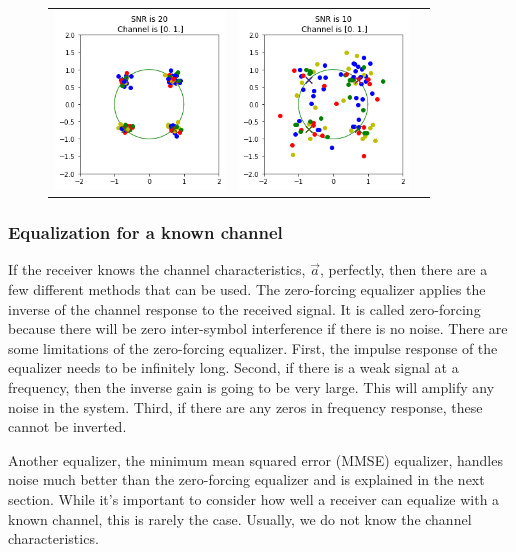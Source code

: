\begin{figure}
\begin{tabular}{ccc}
    \includegraphics[width=45mm]{figures/equal_intro/snr_20_c5/cfo_0.png}&
    \includegraphics[width=45mm]{figures/equal_intro/snr_10_c5/cfo_0.png}\\
  \end{tabular}
  \label{fig:multi_tap}
\end{figure}

\subsubsection{Equalization for a known channel}

If the receiver knows the channel characteristics, $\vec{a}$, perfectly, then there are a few different methods that can be used.  
The zero-forcing equalizer applies the inverse of the channel response to the received signal.  It is called zero-forcing because there will be zero inter-symbol interference if there is no noise.
There are some limitations of the zero-forcing equalizer. 
First, the impulse response of the equalizer needs to be infinitely long. 
Second, if there is a weak signal at a frequency, then the inverse gain is going to be very large.  This will amplify any noise in the system. 
Third, if there are any zeros in frequency response, these cannot be inverted.

Another equalizer, the minimum mean squared error (MMSE) equalizer, handles noise much better than the zero-forcing equalizer and is explained in the next section.
While it's important to consider how well a receiver can equalize with a known channel, this is rarely the case.  Usually, we do not know the channel characteristics.

